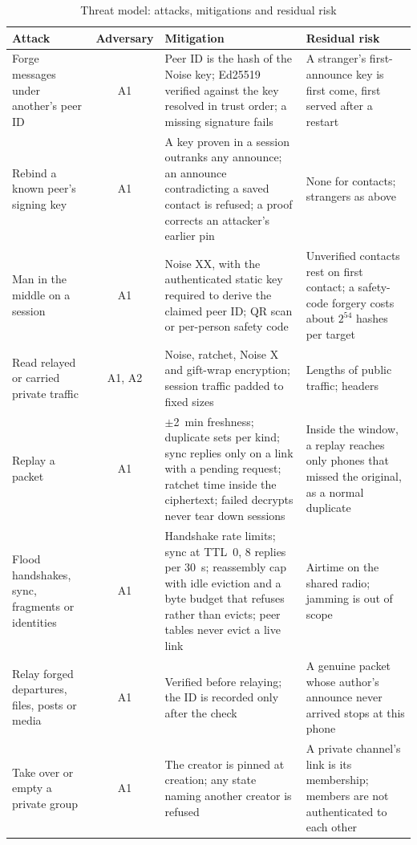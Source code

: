 \documentclass[conference]{IEEEtran}
\begin{document}
\begin{table}[t]
\caption{Threat model: attacks, mitigations and residual risk}
\label{tab:threats}
\centering
\scriptsize
\renewcommand{\arraystretch}{1.12}
\begin{tabular}{@{}L{3.3cm}cL{7.3cm}L{5.0cm}@{}}
\toprule
Attack & Adversary & Mitigation & Residual risk \\
\midrule
Forge messages under another's peer ID & A1 & Peer ID is the hash of the Noise key; Ed25519 verified against the key resolved in trust order; a missing signature fails & A stranger's first-announce key is first come, first served after a restart \\
Rebind a known peer's signing key & A1 & A key proven in a session outranks any announce; an announce contradicting a saved contact is refused; a proof corrects an attacker's earlier pin & None for contacts; strangers as above \\
Man in the middle on a session & A1 & Noise XX, with the authenticated static key required to derive the claimed peer ID; QR scan or per-person safety code & Unverified contacts rest on first contact; a safety-code forgery costs about $2^{54}$ hashes per target \\
Read relayed or carried private traffic & A1, A2 & Noise, ratchet, Noise X and gift-wrap encryption; session traffic padded to fixed sizes & Lengths of public traffic; headers \\
Replay a packet & A1 & $\pm$2~min freshness; duplicate sets per kind; sync replies only on a link with a pending request; ratchet time inside the ciphertext; failed decrypts never tear down sessions & Inside the window, a replay reaches only phones that missed the original, as a normal duplicate \\
Flood handshakes, sync, fragments or identities & A1 & Handshake rate limits; sync at TTL~0, 8 replies per 30~s; reassembly cap with idle eviction and a byte budget that refuses rather than evicts; peer tables never evict a live link & Airtime on the shared radio; jamming is out of scope \\
Relay forged departures, files, posts or media & A1 & Verified before relaying; the ID is recorded only after the check & A genuine packet whose author's announce never arrived stops at this phone \\
Take over or empty a private group & A1 & The creator is pinned at creation; any state naming another creator is refused & A private channel's link is its membership; members are not authenticated to each other \\

\end{tabular}
\end{table}
\end{document}
